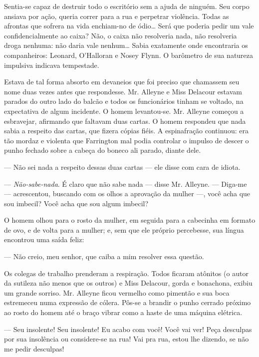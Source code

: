 Sentia-se capaz de destruir todo o escritório sem a ajuda de ninguém.
Seu corpo ansiava por ação, queria correr para a rua e perpetrar
violência. Todas as afrontas que sofrera na vida enchiam-no de
ódio\ldots{} Será que poderia pedir um vale confidencialmente ao caixa?
Não, o caixa não resolveria nada, não resolveria droga nenhuma: não
daria vale nenhum\ldots{} Sabia exatamente onde encontraria os
companheiros: Leonard, O'Halloran e Nosey Flynn. O barômetro de sua
natureza impulsiva indicava tempestade.

Estava de tal forma absorto em devaneios que foi preciso que chamassem
seu nome duas vezes antes que respondesse. Mr. Alleyne e Miss Delacour
estavam parados do outro lado do balcão e todos os funcionários
tinham se voltado, na expectativa de algum incidente. O homem
levantou-se. Mr. Alleyne começou a esbravejar, afirmando que faltavam
duas cartas. O homem respondeu que nada sabia a respeito das cartas,
que fizera cópias fiéis. A espinafração continuou: era tão mordaz e
violenta que Farrington mal podia controlar o impulso de descer o
punho fechado sobre a cabeça do boneco ali parado, diante dele.

--- Não sei nada a respeito dessas duas cartas --- ele disse com cara
de idiota.

--- \textit{Não-sabe-nada}. É claro que não sabe nada --- disse Mr. Alleyne.
--- Diga-me --- acrescentou, buscando com os olhos a aprovação da
mulher ---, você acha que sou imbecil? Você acha que sou algum
imbecil?

O homem olhou para o rosto da mulher, em seguida para a cabecinha em
formato de ovo, e de volta para a mulher; e, sem que ele próprio
percebesse, sua língua encontrou uma saída feliz:

--- Não creio, meu senhor, que caiba a mim resolver essa questão.

Os colegas de trabalho prenderam a respiração. Todos ficaram atônitos
(o autor da sutileza não menos que os outros) e Miss Delacour, gorda
e bonachona, exibiu um grande sorriso. Mr. Alleyne ficou vermelho como
pimentão e sua boca estremeceu numa expressão de cólera. Pôs-se a
brandir o punho cerrado próximo ao rosto do homem até o braço vibrar
como a haste de uma máquina elétrica.

--- Seu insolente! Seu insolente! Eu acabo com você! Você vai ver!
Peça desculpas por sua insolência ou considere-se na rua! Vai pra rua,
estou lhe dizendo, se não me pedir desculpas!

\dotfill\hspace{.7\textwidth}

